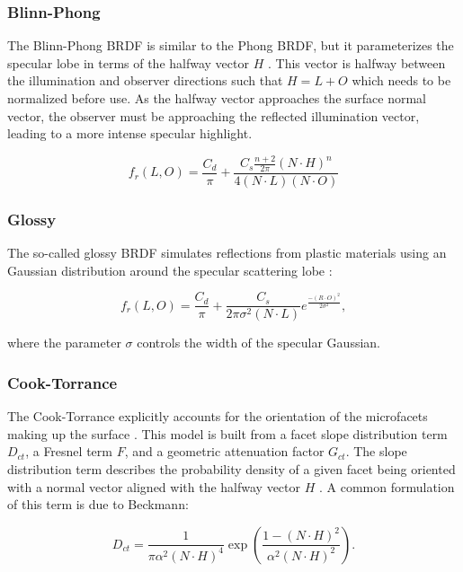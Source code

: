 \subsubsection{Blinn-Phong}

The Blinn-Phong BRDF is similar to the Phong BRDF, but it parameterizes the specular lobe in terms of the halfway vector $H$ \cite{duvenhage2013}. This vector is halfway between the illumination and observer directions such that $H = L + O$ which needs to be normalized before use. As the halfway vector approaches the surface normal vector, the observer must be approaching the reflected illumination vector, leading to a more intense specular highlight. 

\begin{equation} \label{eq:brdf_blinn_phong}
  f_r(L, O) = \frac{C_d}{\pi} + \frac{C_s \frac{n+2}{2\pi} (N \cdot H)^n}{4 (N \cdot L)(N \cdot O)}
\end{equation}

\subsubsection{Glossy}

The so-called glossy BRDF simulates reflections from plastic materials using an Gaussian distribution around the specular scattering lobe \cite{duvenhage2013}:

\begin{equation} \label{eq:brdf_glossy}
  f_r(L, O) = \frac{C_d}{\pi} + \frac{C_s}{2\pi \sigma^2 \left(N \cdot L\right)}  e^{\frac{-\left( R \cdot O \right)^2}{2\sigma^2}},
\end{equation}

where the parameter $\sigma$ controls the width of the specular Gaussian.

\subsubsection{Cook-Torrance}

The Cook-Torrance explicitly accounts for the orientation of the microfacets making up the surface \cite{cook1982}. This model is built from a facet slope distribution term $D_{ct}$, a Fresnel term $F$, and a geometric attenuation factor $G_{ct}$. The slope distribution term describes the probability density of a given facet being oriented with a normal vector aligned with the halfway vector $H$ \cite{cook1982}. A common formulation of this term is due to Beckmann:

\begin{equation} \label{eq:d_beckmann}
  D_{ct} = \frac{1}{\pi \alpha^2 \left( N \cdot H \right)^4} \exp\left( \frac{1 - \left(N \cdot H\right)^2}{\alpha^2 \left(N \cdot H\right)^2} \right).
\end{equation}

